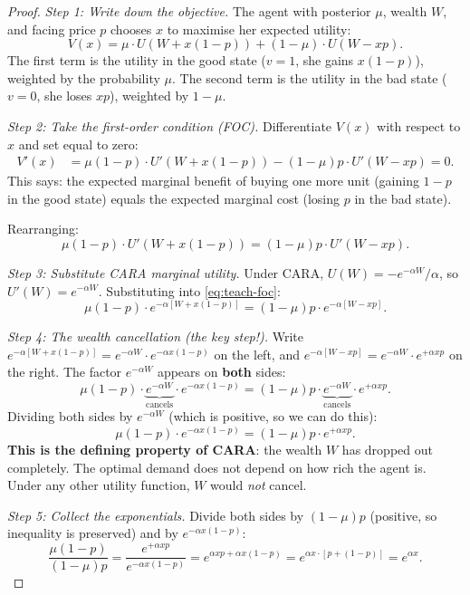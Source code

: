 \documentclass[12pt,letterpaper]{article}
\theoremstyle{definition}
\theoremstyle{remark}
\newcommand{\1}{\mathbf{1}}
\begin{document}
\begin{proof}
\emph{Step 1: Write down the objective.}
The agent with posterior $\mu$, wealth $W$, and facing price $p$ chooses
$x$ to maximise her expected utility:
\[
   V(x) = \mu \cdot U(W + x(1-p)) + (1-\mu) \cdot U(W - xp).
\]
The first term is the utility in the good state ($v=1$, she gains
$x(1-p)$), weighted by the probability $\mu$. The second term is the
utility in the bad state ($v=0$, she loses $xp$), weighted by $1-\mu$.

\emph{Step 2: Take the first-order condition (FOC).}
Differentiate $V(x)$ with respect to $x$ and set equal to zero:
\begin{align*}
   V'(x) &= \mu(1-p) \cdot U'(W + x(1-p)) - (1-\mu)p \cdot U'(W - xp) = 0.
\end{align*}
This says: the expected marginal benefit of buying one more unit
(gaining $1-p$ in the good state) equals the expected marginal cost
(losing $p$ in the bad state).

Rearranging:
\begin{equation}
   \mu(1-p) \cdot U'(W + x(1-p)) = (1-\mu)p \cdot U'(W - xp).
\tag{FOC}
\label{eq:teach-foc}
\end{equation}

\emph{Step 3: Substitute CARA marginal utility.}
Under CARA, $U(W) = -e^{-\alpha W}/\alpha$, so $U'(W) = e^{-\alpha W}$.
Substituting into \eqref{eq:teach-foc}:
\[
   \mu(1-p) \cdot e^{-\alpha[W + x(1-p)]}
   = (1-\mu)p \cdot e^{-\alpha[W - xp]}.
\]

\emph{Step 4: The wealth cancellation (the key step!).}
Write $e^{-\alpha[W + x(1-p)]} = e^{-\alpha W} \cdot e^{-\alpha x(1-p)}$
on the left, and $e^{-\alpha[W - xp]} = e^{-\alpha W} \cdot e^{+\alpha xp}$
on the right. The factor $e^{-\alpha W}$ appears on \textbf{both} sides:
\[
   \mu(1-p) \cdot \underbrace{e^{-\alpha W}}_{\text{cancels}}
   \cdot e^{-\alpha x(1-p)}
   = (1-\mu)p \cdot \underbrace{e^{-\alpha W}}_{\text{cancels}}
   \cdot e^{+\alpha xp}.
\]
Dividing both sides by $e^{-\alpha W}$ (which is positive, so we can do
this):
\[
   \mu(1-p) \cdot e^{-\alpha x(1-p)}
   = (1-\mu)p \cdot e^{+\alpha xp}.
\]
\textbf{This is the defining property of CARA}: the wealth $W$ has
dropped out completely. The optimal demand does not depend on how rich
the agent is. Under any other utility function, $W$ would \emph{not}
cancel.

\emph{Step 5: Collect the exponentials.}
Divide both sides by $(1-\mu)p$ (positive, so inequality is preserved)
and by $e^{-\alpha x(1-p)}$:
\[
   \frac{\mu(1-p)}{(1-\mu)p}
   = \frac{e^{+\alpha xp}}{e^{-\alpha x(1-p)}}
   = e^{\alpha xp + \alpha x(1-p)}
   = e^{\alpha x \cdot [p + (1-p)]}
   = e^{\alpha x}.
\]


\end{proof}
\end{document}
